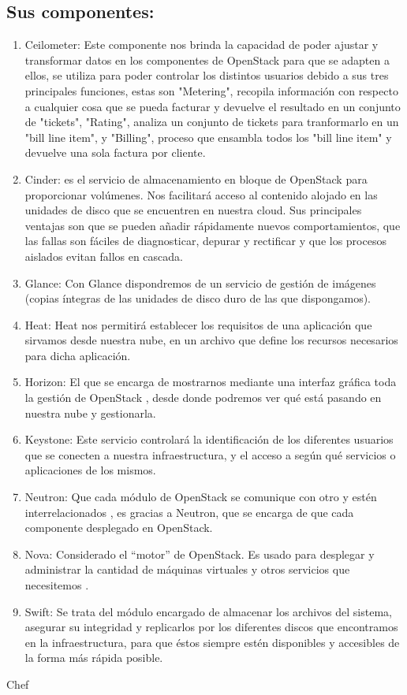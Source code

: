 \documentclass[12pt,letterpaper]{article}
\begin{document}
\subsection{Sus componentes:}
    \begin{enumerate}
    \item  Ceilometer: Este componente nos brinda la capacidad de poder ajustar y transformar datos en los 
componentes de OpenStack para que se adapten a ellos, se utiliza para poder controlar
los distintos usuarios debido a sus tres principales funciones, estas son "Metering",
recopila información con respecto a cualquier cosa que se pueda facturar y devuelve
el resultado en un conjunto de "tickets", "Rating", analiza un conjunto de tickets
para tranformarlo en un "bill line item", y "Billing", proceso que ensambla todos los
"bill line item" y devuelve una sola factura por cliente.

\item  Cinder:
es el servicio de almacenamiento en bloque de OpenStack para proporcionar volúmenes. 
Nos facilitará acceso al contenido alojado en las unidades de disco que se encuentren 
en nuestra cloud. Sus principales ventajas son que se pueden añadir rápidamente nuevos 
comportamientos, que las fallas son fáciles de diagnosticar, depurar y rectificar y que
los procesos aislados evitan fallos en cascada.
\item  Glance:
Con Glance dispondremos de un servicio de gestión de imágenes (copias íntegras de las
 unidades de disco duro de las que dispongamos).
\item  Heat:
Heat nos permitirá establecer los requisitos de una aplicación que sirvamos desde 
nuestra nube, en un archivo que define los recursos necesarios para dicha aplicación. 
\item  Horizon:
El que se encarga de mostrarnos mediante una interfaz gráfica toda la gestión de 
OpenStack , desde donde podremos ver qué está pasando en nuestra nube y gestionarla.
\item  Keystone:
Este servicio controlará la identificación de los diferentes usuarios que se conecten
 a nuestra infraestructura, y el acceso a según qué servicios o aplicaciones de los 
mismos.
\item  Neutron:
Que cada módulo de OpenStack se comunique con otro y estén interrelacionados , es 
gracias a Neutron, que se encarga de que cada componente desplegado en OpenStack.
\item  Nova:
Considerado el “motor” de OpenStack. Es usado para desplegar y administrar la cantidad
 de máquinas virtuales y otros servicios que necesitemos .
\item  Swift:
Se trata del módulo encargado de almacenar los archivos del sistema, asegurar su 
integridad y replicarlos por los diferentes discos que encontramos en la 
infraestructura, para que éstos siempre estén disponibles y accesibles de la forma más
 rápida posible.
	\end{enumerate}	
		
Chef
\end{document}
